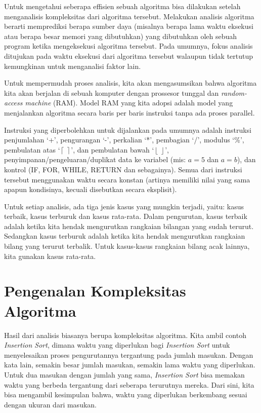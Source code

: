 Untuk mengetahui seberapa effisien sebuah algoritma bisa dilakukan setelah menganalisis kompleksitas dari algoritma tersebut. Melakukan analisis algoritma berarti memprediksi berapa sumber daya (misalnya berapa lama waktu eksekusi atau berapa besar memori yang dibutuhkan) yang dibutuhkan oleh sebuah program ketika mengeksekusi algoritma tersebut. Pada umumnya, fokus analisis ditujukan pada waktu eksekusi dari algoritma tersebut walaupun tidak tertutup kemungkinan untuk menganalisi faktor lain.

Untuk mempermudah proses analisis, kita akan mengasumsikan bahwa algoritma kita akan berjalan di sebuah komputer dengan prossesor tunggal dan \textit{random-access machine} (RAM). Model RAM yang kita adopsi adalah model yang menjalankan algoritma secara baris per baris instruksi tanpa ada proses parallel. 

Instruksi yang diperbolehkan untuk dijalankan pada umumnya adalah instruksi penjumlahan `+', pengurangan `-', perkalian `*', pembagian `/', modulus `\%', pembulatan atas `$\left\lceil\  \right\rceil$', dan pembulatan bawah `$\left\lfloor\ \right\rfloor$', penyimpanan/pengeluaran/duplikat data ke variabel (mis: $a = 5$ dan $a = b$), dan kontrol (IF, FOR, WHILE, RETURN dan sebagainya). Semua dari instruksi tersebut menggunakan waktu secara konstan (artinya memiliki nilai yang sama apapun kondisinya, kecuali disebutkan secara eksplisit).

Untuk setiap analisis, ada tiga jenis kasus yang mungkin terjadi, yaitu: kasus terbaik, kasus terburuk dan kasus rata-rata. Dalam pengurutan, kasus terbaik adalah ketika kita hendak mengurutkan rangkaian bilangan yang sudah terurut. Sedangkan kasus terburuk adalah ketika kita hendak mengurutkan rangkaian bilang yang terurut terbalik. Untuk kasus-kasus rangkaian bilang acak lainnya, kita gunakan kasus rata-rata.

\section{Pengenalan Kompleksitas Algoritma}
Hasil dari analisis biasanya berupa kompleksitas algoritma. Kita ambil contoh \textit{Insertion Sort}, dimana waktu yang diperlukan bagi \textit{Insertion Sort} untuk menyelesaikan proses pengurutannya tergantung pada jumlah masukan. Dengan kata lain, semakin besar jumlah masukan, semakin lama waktu yang diperlukan. Untuk dua masukan dengan jumlah yang sama, \textit{Insertion Sort} bisa memakan waktu yang berbeda tergantung dari seberapa terurutnya mereka. Dari sini, kita bisa mengambil kesimpulan bahwa, waktu yang diperlukan berkembang sesuai dengan ukuran dari masukan.

